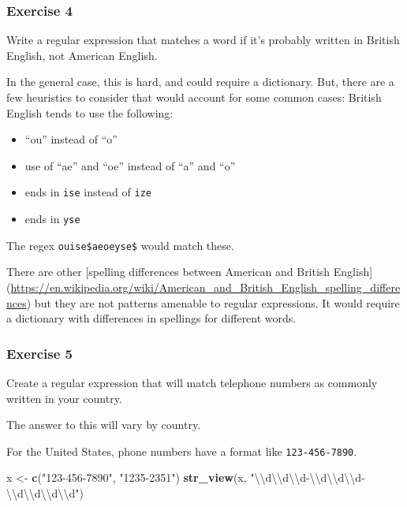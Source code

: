 \documentclass[]{book}
\newenvironment{Shaded}{\begin{snugshade}}{\end{snugshade}}
\newcommand{\CharTok}[1]{\textcolor[rgb]{0.31,0.60,0.02}{#1}}
\newcommand{\KeywordTok}[1]{\textcolor[rgb]{0.13,0.29,0.53}{\textbf{#1}}}
\newcommand{\NormalTok}[1]{#1}
\newcommand{\StringTok}[1]{\textcolor[rgb]{0.31,0.60,0.02}{#1}}
\providecommand{\tightlist}{%
  \setlength{\itemsep}{0pt}\setlength{\parskip}{0pt}}
\theoremstyle{plain}
\theoremstyle{remark}
\theoremstyle{definition}
\theoremstyle{definition}
\theoremstyle{definition}
\theoremstyle{remark}
\begin{document}
\hypertarget{exercise-4-21}{%
\subsubsection{Exercise 4}\label{exercise-4-21}}

Write a regular expression that matches a word if it's probably written
in British English, not American English.

In the general case, this is hard, and could require a dictionary. But,
there are a few heuristics to consider that would account for some
common cases: British English tends to use the following:

\begin{itemize}
\tightlist
\item
  ``ou'' instead of ``o''
\item
  use of ``ae'' and ``oe'' instead of ``a'' and ``o''
\item
  ends in \texttt{ise} instead of \texttt{ize}
\item
  ends in \texttt{yse}
\end{itemize}

The regex
\texttt{ou\textbar{}ise\$\textbar{}ae\textbar{}oe\textbar{}yse\$} would
match these.

There are other {[}spelling differences between American and British
English{]}
(\url{https://en.wikipedia.org/wiki/American_and_British_English_spelling_differences})
but they are not patterns amenable to regular expressions. It would
require a dictionary with differences in spellings for different words.

\hypertarget{exercise-5-13}{%
\subsubsection{Exercise 5}\label{exercise-5-13}}

Create a regular expression that will match telephone numbers as
commonly written in your country.

The answer to this will vary by country.

For the United States, phone numbers have a format like
\texttt{123-456-7890}.

\begin{Shaded}
\begin{Highlighting}[]
\NormalTok{x <-}\StringTok{ }\KeywordTok{c}\NormalTok{(}\StringTok{"123-456-7890"}\NormalTok{, }\StringTok{"1235-2351"}\NormalTok{)}
\KeywordTok{str_view}\NormalTok{(x, }\StringTok{"}\CharTok{\textbackslash{}\textbackslash{}}\StringTok{d}\CharTok{\textbackslash{}\textbackslash{}}\StringTok{d}\CharTok{\textbackslash{}\textbackslash{}}\StringTok{d-}\CharTok{\textbackslash{}\textbackslash{}}\StringTok{d}\CharTok{\textbackslash{}\textbackslash{}}\StringTok{d}\CharTok{\textbackslash{}\textbackslash{}}\StringTok{d-}\CharTok{\textbackslash{}\textbackslash{}}\StringTok{d}\CharTok{\textbackslash{}\textbackslash{}}\StringTok{d}\CharTok{\textbackslash{}\textbackslash{}}\StringTok{d}\CharTok{\textbackslash{}\textbackslash{}}\StringTok{d"}\NormalTok{)}
\end{Highlighting}
\end{Shaded}
\end{document}
